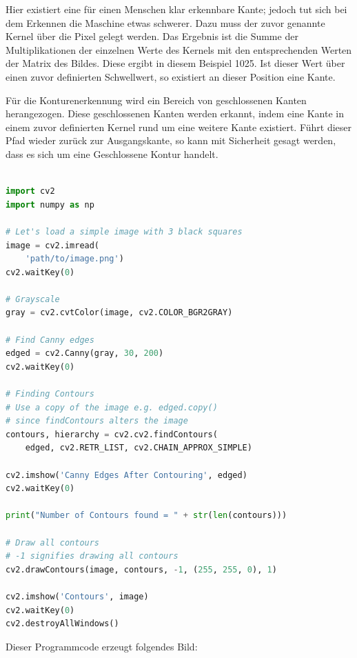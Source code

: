 Hier existiert eine für einen Menschen klar erkennbare Kante; jedoch tut sich bei dem Erkennen die Maschine etwas schwerer. Dazu muss der zuvor genannte Kernel über die Pixel gelegt werden. Das Ergebnis ist die Summe der Multiplikationen der einzelnen Werte des Kernels mit den entsprechenden Werten der Matrix des Bildes. Diese ergibt in diesem Beispiel 1025. Ist dieser Wert über einen zuvor definierten Schwellwert, so existiert an dieser Position eine Kante.

Für die Konturenerkennung wird ein Bereich von geschlossenen Kanten herangezogen. Diese geschlossenen Kanten werden erkannt, indem eine Kante in einem zuvor definierten Kernel rund um eine weitere Kante existiert. Führt dieser Pfad wieder zurück zur Ausgangskante, so kann mit Sicherheit gesagt werden, dass es sich um eine Geschlossene Kontur handelt.



\begin{lstlisting}[caption=Adaptive Gaussian Thresholding,language=Python,label=maai:gaussianthresholding]
    
import cv2
import numpy as np

# Let's load a simple image with 3 black squares
image = cv2.imread(
    'path/to/image.png')
cv2.waitKey(0)

# Grayscale
gray = cv2.cvtColor(image, cv2.COLOR_BGR2GRAY)

# Find Canny edges
edged = cv2.Canny(gray, 30, 200)
cv2.waitKey(0)

# Finding Contours
# Use a copy of the image e.g. edged.copy()
# since findContours alters the image
contours, hierarchy = cv2.cv2.findContours(
    edged, cv2.RETR_LIST, cv2.CHAIN_APPROX_SIMPLE)

cv2.imshow('Canny Edges After Contouring', edged)
cv2.waitKey(0)

print("Number of Contours found = " + str(len(contours)))

# Draw all contours
# -1 signifies drawing all contours
cv2.drawContours(image, contours, -1, (255, 255, 0), 1)

cv2.imshow('Contours', image)
cv2.waitKey(0)
cv2.destroyAllWindows()

\end{lstlisting}

Dieser Programmcode erzeugt folgendes Bild:


